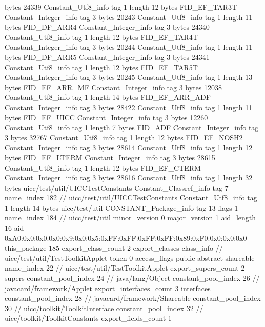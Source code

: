 {{{			bytes	24339
		}
		Constant_Utf8_info {
			tag	1
			length	12
			bytes	FID_EF_TAR3T
		}
		Constant_Integer_info {
			tag	3
			bytes	20243
		}
		Constant_Utf8_info {
			tag	1
			length	11
			bytes	FID_DF_ARR4
		}
		Constant_Integer_info {
			tag	3
			bytes	24340
		}
		Constant_Utf8_info {
			tag	1
			length	12
			bytes	FID_EF_TAR4T
		}
		Constant_Integer_info {
			tag	3
			bytes	20244
		}
		Constant_Utf8_info {
			tag	1
			length	11
			bytes	FID_DF_ARR5
		}
		Constant_Integer_info {
			tag	3
			bytes	24341
		}
		Constant_Utf8_info {
			tag	1
			length	12
			bytes	FID_EF_TAR5T
		}
		Constant_Integer_info {
			tag	3
			bytes	20245
		}
		Constant_Utf8_info {
			tag	1
			length	13
			bytes	FID_EF_ARR_MF
		}
		Constant_Integer_info {
			tag	3
			bytes	12038
		}
		Constant_Utf8_info {
			tag	1
			length	14
			bytes	FID_EF_ARR_ADF
		}
		Constant_Integer_info {
			tag	3
			bytes	28422
		}
		Constant_Utf8_info {
			tag	1
			length	11
			bytes	FID_EF_UICC
		}
		Constant_Integer_info {
			tag	3
			bytes	12260
		}
		Constant_Utf8_info {
			tag	1
			length	7
			bytes	FID_ADF
		}
		Constant_Integer_info {
			tag	3
			bytes	32767
		}
		Constant_Utf8_info {
			tag	1
			length	12
			bytes	FID_EF_NOSH2
		}
		Constant_Integer_info {
			tag	3
			bytes	28614
		}
		Constant_Utf8_info {
			tag	1
			length	12
			bytes	FID_EF_LTERM
		}
		Constant_Integer_info {
			tag	3
			bytes	28615
		}
		Constant_Utf8_info {
			tag	1
			length	12
			bytes	FID_EF_CTERM
		}
		Constant_Integer_info {
			tag	3
			bytes	28616
		}
		Constant_Utf8_info {
			tag	1
			length	32
			bytes	uicc/test/util/UICCTestConstants
		}
		Constant_Classref_info {
			tag	7
			name_index	182		// uicc/test/util/UICCTestConstants
		}
		Constant_Utf8_info {
			tag	1
			length	14
			bytes	uicc/test/util
		}
		CONSTANT_Package_info {
			tag	13
			flags	1
			name_index	184		// uicc/test/util
			minor_version	0
			major_version	1
			aid_length	16
			aid	0xA0:0x0:0x0:0x0:0x9:0x0:0x5:0xFF:0xFF:0xFF:0xFF:0x89:0xF0:0x0:0x0:0x0
		}
	}
	this_package	185
	export_class_count	2
	export_classes {
		class_info {		// uicc/test/util/TestToolkitApplet
			token	0
			access_flags	public abstract shareable
			name_index	22		// uicc/test/util/TestToolkitApplet
			export_supers_count	2
			supers {
				constant_pool_index	24		// java/lang/Object
				constant_pool_index	26		// javacard/framework/Applet
			}
			export_interfaces_count	3
			interfaces {
				constant_pool_index	28		// javacard/framework/Shareable
				constant_pool_index	30		// uicc/toolkit/ToolkitInterface
				constant_pool_index	32		// uicc/toolkit/ToolkitConstants
			}
			export_fields_count	1
}}}
